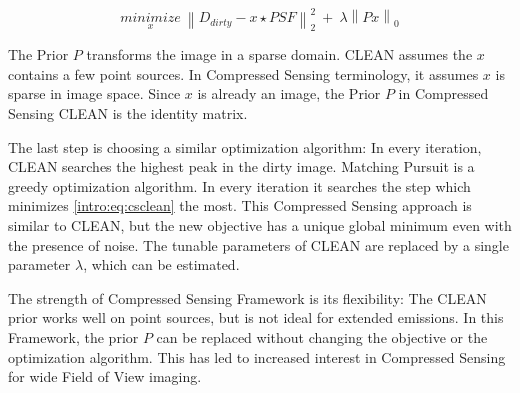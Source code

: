 \begin{equation}\label{intro:eq:csclean}
	\underset{x}{minimize} \: \left \| D_{dirty} - x \star PSF \right \|_2^2 \: + \: \lambda \left \| Px \right \|_0
\end{equation}

The Prior $P$ transforms the image in a sparse domain. CLEAN assumes the $x$ contains a few point sources. In Compressed Sensing terminology, it assumes $x$ is sparse in image space. Since $x$ is already an image, the Prior $P$ in Compressed Sensing CLEAN is the identity matrix.  

The last step is choosing a similar optimization algorithm: In every iteration, CLEAN searches the highest peak in the dirty image. Matching Pursuit is a greedy optimization algorithm. In every iteration it searches the step which minimizes \eqref{intro:eq:csclean} the most. This Compressed Sensing approach is similar to CLEAN, but the new objective has a unique global minimum even with the presence of noise. The tunable parameters of CLEAN are replaced by a single parameter $\lambda$, which can be estimated.

The strength of Compressed Sensing Framework is its flexibility: The CLEAN prior works well on point sources, but is not ideal for extended emissions. In this Framework, the prior $P$ can be replaced without changing the objective or the optimization algorithm. This has led to increased interest in Compressed Sensing for wide Field of View imaging.


